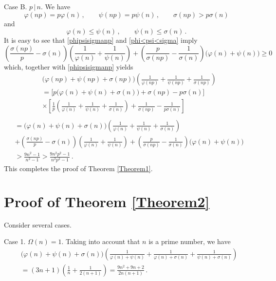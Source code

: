 \documentclass[12pt]{article}
\begin{document}
Case B.  \;  $p\,|\,n$.  We have
\begin{equation}\label{phipsisigmanp}
\varphi(np)=p\varphi(n)\,, \qquad \psi(np)=p\psi(n)\,, \qquad \sigma(np)>p\sigma(n)
\end{equation}
and
\begin{equation}\label{phi<psi<sigma}
\varphi(n)\leq\psi(n)\,, \qquad \psi(n)\leq \sigma(n)\,.
\end{equation}
It is easy to see that \eqref{phipsisigmanp} and \eqref{phi<psi<sigma} imply
\begin{equation*}
\left(\frac{\sigma(np)}{p}-\sigma(n)\right)\left(\frac{1}{\varphi(n)}+\frac{1}{\psi(n)}\right)+\left(\frac{p}{\sigma(np)}-\frac{1}{\sigma(n)}\right)\big(\varphi(n)+\psi(n)\big)\geq0
\end{equation*}
which, together with \eqref{phipsisigmanp} yields
\begin{align*}
&\big(\varphi(np)+\psi(np)+\sigma(np)\big)\left(\frac{1}{\varphi(np)}+\frac{1}{\psi(np)}+\frac{1}{\sigma(np)}\right)\\
&=\Big[p\big(\varphi(n)+\psi(n)+\sigma(n)\big)+\sigma(np)-p\sigma(n)\Big]\\
&\times\left[\frac{1}{p}\left(\frac{1}{\varphi(n)}+\frac{1}{\psi(n)}+\frac{1}{\sigma(n)}\right)+\frac{1}{\sigma(np)}-\frac{1}{p\sigma(n)}\right]\\
\end{align*}
\begin{align*}
&=\big(\varphi(n)+\psi(n)+\sigma(n)\big)\left(\frac{1}{\varphi(n)}+\frac{1}{\psi(n)}+\frac{1}{\sigma(n)}\right)\\
&+\left(\frac{\sigma(np)}{p}-\sigma(n)\right)\left(\frac{1}{\varphi(n)}+\frac{1}{\psi(n)}\right)+\left(\frac{p}{\sigma(np)}-\frac{1}{\sigma(n)}\right)\big(\varphi(n)+\psi(n)\big)\\
&>\frac{9n^2-1}{n^2-1}>\frac{9n^2p^2-1}{n^2p^2-1}\,.
\end{align*}
This completes the proof of Theorem \ref{Theorem1}.



\section{Proof of Theorem \ref{Theorem2}}

Consider several cases.

Case 1. \; $\Omega(n)=1$. Taking into account that $n$ is a prime number, we  have
\begin{align*}
&\big(\varphi(n)+\psi(n)+\sigma(n)\big)\left(\frac{1}{\varphi(n)+\psi(n)}+\frac{1}{\varphi(n)+\sigma(n)}+\frac{1}{\psi(n)+\sigma(n)}\right)\\
&=(3n+1)\left(\frac{1}{n}+\frac{1}{2(n+1)}\right)=\frac{9n^2+9n+2}{2n(n+1)}\,.
\end{align*}
\end{document}
